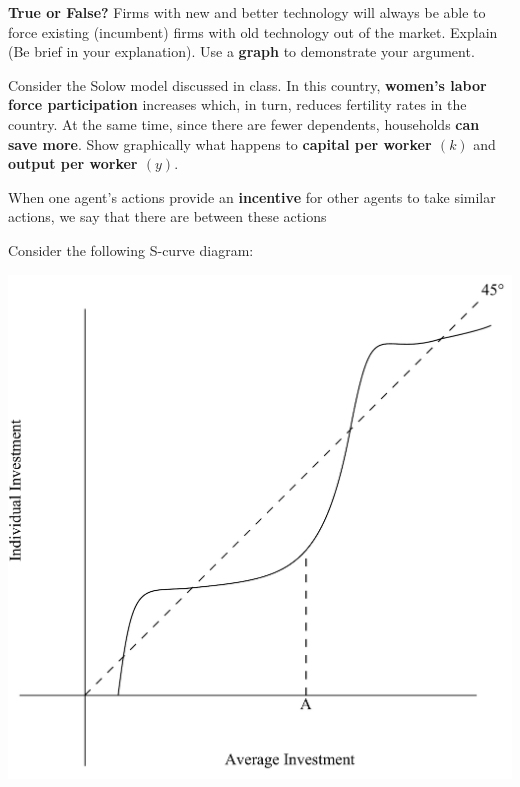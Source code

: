 \documentclass[12pt]{exam}
\begin{document}
\begin{questions}
    
\question 
\textbf{True or False?}
Firms with new and better technology will always be able to force existing (incumbent) firms with old technology out of the market. 
Explain (Be brief in your explanation).
Use a \textbf{graph} to demonstrate your argument.

\question
Consider the Solow model discussed in class.
In this country, \textbf{women's labor force participation} increases which, in turn, reduces fertility rates in the country. 
At the same time, since there are fewer dependents, households \textbf{can save more}. 
Show graphically what happens to \textbf{capital per worker $(k)$} and \textbf{output per worker $(y)$}.

\newpage 

\question
When one agent's actions provide an \textbf{incentive} for other agents to take similar actions, we say that there are \fillin[complementarities][4cm] between these actions

\question
Consider the following S-curve diagram:
\begin{center}
\includegraphics[scale=0.3]{images/scurve.pdf}
\end{center}


\end{questions}
\end{document}
